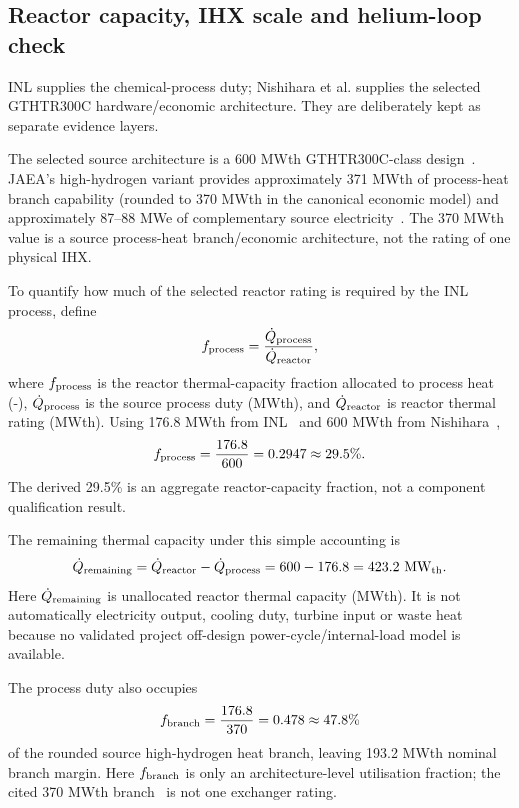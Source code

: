 \subsection{Reactor capacity, IHX scale and helium-loop check}
INL supplies the chemical-process duty; Nishihara et al. supplies the selected GTHTR300C hardware/economic architecture. They are deliberately kept as separate evidence layers.

The selected source architecture is a 600 MWth GTHTR300C-class design~\cite{nishihara2007potential}. JAEA's high-hydrogen variant provides approximately 371 MWth of process-heat branch capability (rounded to 370 MWth in the canonical economic model) and approximately 87--88 MWe of complementary source electricity~\cite{nishihara2007potential}. The 370 MWth value is a source process-heat branch/economic architecture, not the rating of one physical IHX.

To quantify how much of the selected reactor rating is required by the INL process, define
\begin{equation}\label{eq:reactor-process-fraction}
f_{\rm process}=\frac{\dot Q_{\rm process}}{\dot Q_{\rm reactor}},
\end{equation}
where $f_{\rm process}$ is the reactor thermal-capacity fraction allocated to process heat (-), $\dot Q_{\rm process}$ is the source process duty (MWth), and $\dot Q_{\rm reactor}$ is reactor thermal rating (MWth). Using 176.8 MWth from INL~\cite{inltev961} and 600 MWth from Nishihara~\cite{nishihara2007potential},
\begin{equation}\label{eq:reactor-process-fraction-sub}
f_{\rm process}=\frac{176.8}{600}=0.2947\approx29.5\%.
\end{equation}
The derived 29.5\% is an aggregate reactor-capacity fraction, not a component qualification result.

The remaining thermal capacity under this simple accounting is
\begin{equation}\label{eq:remaining-thermal}
\dot Q_{\rm remaining}=\dot Q_{\rm reactor}-\dot Q_{\rm process}
=600-176.8=423.2~\mathrm{MW_{th}}.
\end{equation}
Here $\dot Q_{\rm remaining}$ is unallocated reactor thermal capacity (MWth). It is not automatically electricity output, cooling duty, turbine input or waste heat because no validated project off-design power-cycle/internal-load model is available.

The process duty also occupies
\begin{equation}\label{eq:branch-utilisation}
f_{\rm branch}=\frac{176.8}{370}=0.478\approx47.8\%
\end{equation}
of the rounded source high-hydrogen heat branch, leaving 193.2 MWth nominal branch margin. Here $f_{\rm branch}$ is only an architecture-level utilisation fraction; the cited 370 MWth branch~\cite{nishihara2007potential} is not one exchanger rating.

